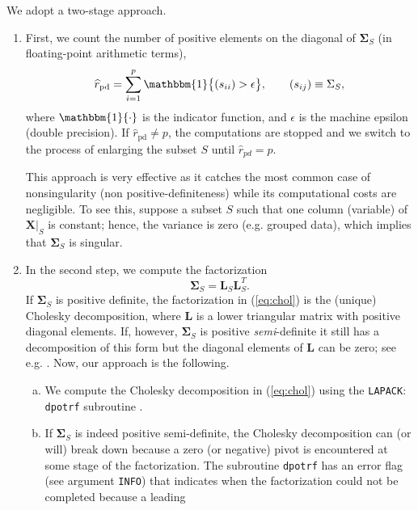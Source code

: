 \documentclass[a4paper,oneside,11pt,DIV=12]{scrartcl}
\newcommand{\code}[1]{{\texttt{#1}}}
\begin{document}
We adopt a two-stage approach.
\begin{enumerate}[(1)]
	\item First, we count the number of positive elements on the
		diagonal of $\bm \Sigma_S$ (in floating-point arithmetic terms),
		 \begin{equation}\label{eq:nonsingular1}
			\widehat{r}_{\mathrm{pd}} = \sum_{i=1}^p \mathbbm{1}
				\big\{ (s_{ii}) > \epsilon \big\}, \qquad (s_{ij}) \equiv
				\Sigma_S,
		 \end{equation}
		where $\mathbbm{1}\{ \cdot \}$ is the indicator function, and
		$\epsilon$ is the machine epsilon (double precision). If
		$\widehat{r}_{\mathrm{pd}} \neq p$, the computations are stopped
		and we switch to the process of enlarging the subset $S$
		until $\widehat{r}_{pd} = p$.

		This approach is very effective as it catches the most common
		case of nonsingularity (non positive-definiteness) while its
		computational costs are negligible. To see this, suppose a subset
		$S$ such that one column (variable) of $\bm X\vert_S$ is
		constant; hence, the variance is zero (e.g. grouped data),
		which implies that $\bm \Sigma_S$ is singular.
	\item In the second step, we compute the factorization
		\begin{equation}\label{eq:chol}
			\bm \Sigma_S = \bm L_S \bm L_S^T.
		\end{equation}
		If $\bm \Sigma_S$ is positive definite, the factorization
		in (\ref{eq:chol}) is the (unique) Cholesky decomposition,
		where $\bm L$ is a lower triangular matrix with positive diagonal
		elements. If, however, $\bm \Sigma_S$ is positive
		\textit{semi}-definite it still has a decomposition of this
		form but the diagonal elements of $\bm L$ can be zero; see e.g.
		\citet[][Chap. 4.2.8]{golub_loan_1996}. Now, our approach is
		the following.
		\begin{enumerate}[a)]
			\item  We compute the Cholesky decomposition in (\ref{eq:chol})
				using the \code{LAPACK}: \code{dpotrf} subroutine
				\citep{anderson_bai_etal_1999}.
			\item If $\bm \Sigma_S$ is indeed positive semi-definite,
				the Cholesky decomposition can (or will) break down because
				a zero (or negative) pivot is encountered at some stage
				of the factorization. The subroutine \code{dpotrf} has an
				error flag (see argument \code{INFO}) that indicates when
				the factorization could not be completed because a leading

\end{enumerate}
\end{enumerate}
\end{document}
